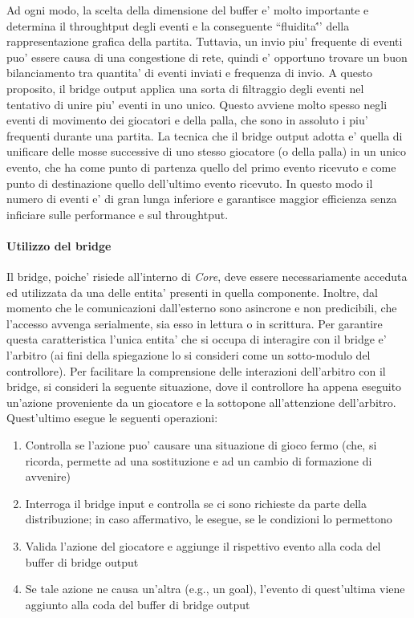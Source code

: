 Ad ogni modo, la scelta della dimensione del buffer e' molto importante e determina il throughtput degli eventi e la conseguente ``fluidita\''' della rappresentazione grafica della partita. Tuttavia, un invio piu' frequente di eventi puo' essere causa di una congestione di rete, quindi e' opportuno trovare un buon bilanciamento tra quantita' di eventi inviati e frequenza di invio. A questo proposito, il bridge output applica una sorta di filtraggio degli eventi nel tentativo di unire piu' eventi in uno unico. Questo avviene molto spesso negli eventi di movimento dei giocatori e della palla, che sono in assoluto i piu' frequenti durante una partita. La tecnica che il bridge output adotta e' quella di unificare delle mosse successive di uno stesso giocatore (o della palla) in un unico evento, che ha come punto di partenza quello del primo evento ricevuto e come punto di destinazione quello dell'ultimo evento ricevuto. In questo modo il numero di eventi e' di gran lunga inferiore e garantisce maggior efficienza senza inficiare sulle performance e sul throughtput.

\paragraph{Utilizzo del bridge}\label{sec:analisi_distribuzione_bridge_utilizzo} Il bridge, poiche' risiede all'interno di \textit{Core}, deve essere necessariamente acceduta ed utilizzata da una delle entita' presenti in quella componente. Inoltre, dal momento che le comunicazioni dall'esterno sono asincrone e non predicibili, che l'accesso avvenga serialmente, sia esso in lettura o in scrittura. Per garantire questa caratteristica l'unica entita' che si occupa di interagire con il bridge e' l'arbitro (ai fini della spiegazione lo si consideri come un sotto-modulo del controllore). Per facilitare la comprensione delle interazioni dell'arbitro con il bridge, si consideri la seguente situazione, dove il controllore ha appena eseguito un'azione proveniente da un giocatore e la sottopone all'attenzione dell'arbitro. Quest'ultimo esegue le seguenti operazioni:

\begin{enumerate}
	\item Controlla se l'azione puo' causare una situazione di gioco fermo (che, si ricorda, permette ad una sostituzione e ad un cambio di formazione di avvenire)
	\item Interroga il bridge input e controlla se ci sono richieste da parte della distribuzione; in caso affermativo, le esegue, se le condizioni lo permettono
	\item Valida l'azione del giocatore e aggiunge il rispettivo evento alla coda del buffer di bridge output
	\item Se tale azione ne causa un'altra (e.g., un goal), l'evento di quest'ultima viene aggiunto alla coda del buffer di bridge output
\end{enumerate}

